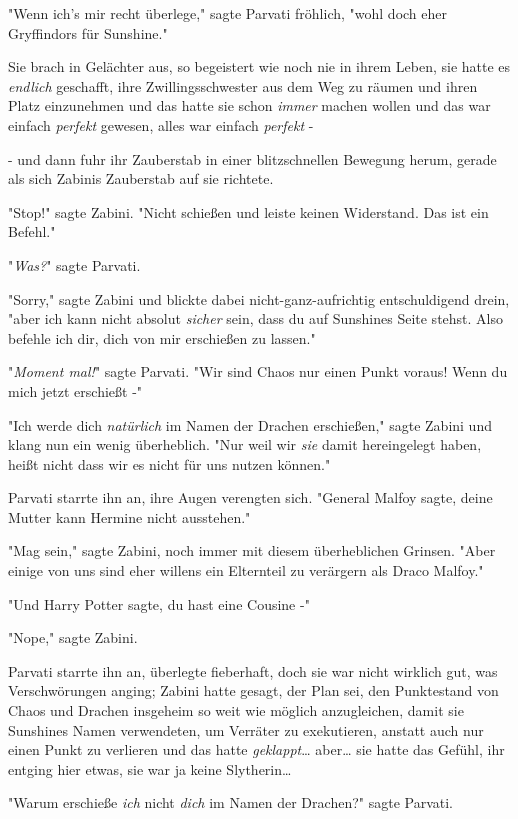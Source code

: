 {"Wenn ich's mir recht überlege," sagte Parvati fröhlich, "wohl doch eher Gryffindors für Sunshine."

Sie brach in Gelächter aus, so begeistert wie noch nie in ihrem Leben, sie hatte es \emph{endlich} geschafft, ihre Zwillingsschwester aus dem Weg zu räumen und ihren Platz einzunehmen und das hatte sie schon \emph{immer} machen wollen und das war einfach \emph{perfekt} gewesen, alles war einfach \emph{perfekt} -

- und dann fuhr ihr Zauberstab in einer blitzschnellen Bewegung herum, gerade als sich Zabinis Zauberstab auf sie richtete.

"Stop!" sagte Zabini. "Nicht schießen und leiste keinen Widerstand. Das ist ein Befehl."

"\emph{Was?}" sagte Parvati.

"Sorry," sagte Zabini und blickte dabei nicht-ganz-aufrichtig entschuldigend drein, "aber ich kann nicht absolut \emph{sicher} sein, dass du auf Sunshines Seite stehst. Also befehle ich dir, dich von mir erschießen zu lassen."

"\emph{Moment mal!}" sagte Parvati. "Wir sind Chaos nur einen Punkt voraus! Wenn du mich jetzt erschießt -"

"Ich werde dich \emph{natürlich} im Namen der Drachen erschießen," sagte Zabini und klang nun ein wenig überheblich. "Nur weil wir \emph{sie} damit hereingelegt haben, heißt nicht dass wir es nicht für uns nutzen können."

Parvati starrte ihn an, ihre Augen verengten sich. "General Malfoy sagte, deine Mutter kann Hermine nicht ausstehen."

"Mag sein," sagte Zabini, noch immer mit diesem überheblichen Grinsen. "Aber einige von uns sind eher willens ein Elternteil zu verärgern als Draco Malfoy."

"Und Harry Potter sagte, du hast eine Cousine -"

"Nope," sagte Zabini.

Parvati starrte ihn an, überlegte fieberhaft, doch sie war nicht wirklich gut, was Verschwörungen anging; Zabini hatte gesagt, der Plan sei, den Punktestand von Chaos und Drachen insgeheim so weit wie möglich anzugleichen, damit sie Sunshines Namen verwendeten, um Verräter zu exekutieren, anstatt auch nur einen Punkt zu verlieren und das hatte \emph{geklappt}… aber… sie hatte das Gefühl, ihr entging hier etwas, sie war ja keine Slytherin…

"Warum erschieße \emph{ich} nicht \emph{dich} im Namen der Drachen?" sagte Parvati.

}
